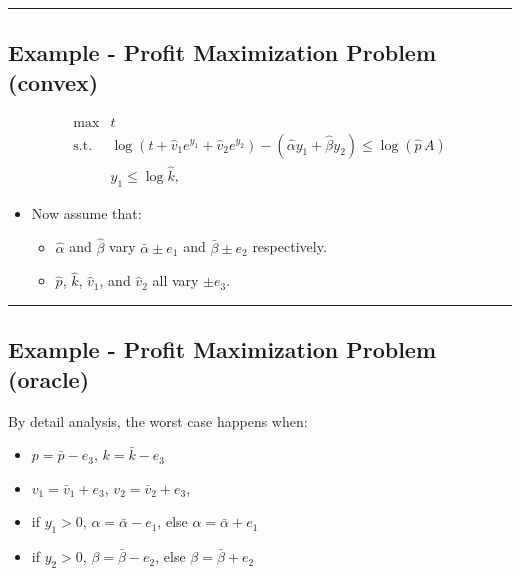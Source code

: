 \documentclass[
]{article}
\providecommand{\tightlist}{%
  \setlength{\itemsep}{0pt}\setlength{\parskip}{0pt}}
\begin{document}
\begin{center}\rule{0.5\linewidth}{0.5pt}\end{center}

\subsection{Example - Profit Maximization Problem
(convex)}\label{example---profit-maximization-problem-convex}

\[\begin{array}{ll}
\text{max}  & t \\
\text{s.t.} & \log(t + \hat{v}_1 e^{y_1} + \hat{v}_2 e^{y_2}) - (\hat{\alpha} y_1 + \hat{\beta} y_2) \le \log(\hat{p}\,A)  \\
                  & y_1 \le \log \hat{k} ,
\end{array}\]

\begin{itemize}
\tightlist
\item
  Now assume that:

  \begin{itemize}
  \tightlist
  \item
    \(\hat{\alpha}\) and \(\hat{\beta}\) vary \(\bar{\alpha} \pm e_1\)
    and \(\bar{\beta} \pm e_2\) respectively.
  \item
    \(\hat{p}\), \(\hat{k}\), \(\hat{v}_1\), and \(\hat{v}_2\) all vary
    \(\pm e_3\).
  \end{itemize}
\end{itemize}

\begin{center}\rule{0.5\linewidth}{0.5pt}\end{center}

\subsection{Example - Profit Maximization Problem
(oracle)}\label{example---profit-maximization-problem-oracle}

By detail analysis, the worst case happens when:

\begin{itemize}
\tightlist
\item
  \(p = \bar{p} - e_3\), \(k = \bar{k} - e_3\)
\item
  \(v_1 = \bar{v}_1 + e_3\), \(v_2 = \bar{v}_2 + e_3\),
\item
  if \(y_1 > 0\), \(\alpha = \bar{\alpha} - e_1\), else
  \(\alpha = \bar{\alpha} + e_1\)
\item
  if \(y_2 > 0\), \(\beta = \bar{\beta} - e_2\), else
  \(\beta = \bar{\beta} + e_2\)
\end{itemize}
\end{document}
